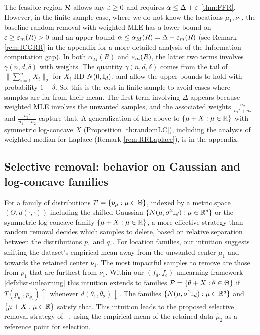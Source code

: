 \begin{remark} \label{rem:ICGRRM}
The feasible region $\mathcal{R}$ allows any $\varepsilon \geq 0$ and requires $\alpha \leq \Delta +\varepsilon$ \ref{thm:FFR}. However, in the finite sample case, where we do not know the locations $\mu_1, \nu_1$, the baseline random removal with weighted MLE has a  lower bound on $\varepsilon \geq \varepsilon_m(R)>0$ and an upper bound $\alpha \leq \alpha_M(R)= \Delta -\varepsilon_m(R)$ (see Remark \ref{rem:ICGRR} in the appendix for a more detailed analysis of the Information-computation gap). In both $\alpha_M(R)$ and  $\varepsilon_m(R)$, the latter two terms involves  $\gamma(n, d, \delta)$ with weights. The quantity $\gamma(n, d, \delta)$ comes from the tail of $\|\sum_{i=1}^n X_i\|_2$ for $X_i$ IID $N(0,\mathbb{I}_d)$, and allow the upper bounds to hold with probability $1-\delta$. So, this is the cost in finite sample to avoid cases where samples are far from their mean. The first term involving $\Delta$ appears because weighted MLE involves the unwanted samples, and the associated weights $\frac{n_2}{n_1' + n_2}$ and $\frac{n_1'}{n_1' + n_2}$ capture that. A generalization of the above to  $\{\mu+X:\mu\in \mathbb{R}\}$ with symmetric log-concave $X$ (Proposition \ref{th:randomLC}), including the analysis of weighted median for Laplace (Remark \ref{rem:RRLaplace}), is in the appendix.
\end{remark} 
 


\vspace{-4mm}
\subsection{Selective removal: behavior on Gaussian and log-concave families}
\vspace{-2mm}

For a family of distributions $\mathcal{P}=\{p_{\mu}: \mu\in \Theta\}$, indexed by a metric space  $(\Theta, d(\cdot, \cdot))$  including the shifted Gaussian $\{N(\mu, \sigma^2 \mathbb{I}_d): \mu \in \mathbb{R}^d\}$ or the symmetric log-concave family $\{\mu+X: \mu\in \mathbb{R}\}$, a more effective strategy than random removal decides which samples to delete, based on relative separation between the distributions $p_1$ and $q_1$. For location families, our intuition suggests shifting the dataset's empirical mean away from the unwanted center $\mu_1$ and towards the retained center $\nu_1$. The most impactful samples to remove are those from $p_1$ that are furthest from $\nu_1$. Within our $(f_d,f_c)$ unlearning framework \ref{def:dist-unlearning} this intuition extends to families $\mathcal{P}=\{\theta+X: \theta\in \Theta\}$ if $T(p_{\theta_1}, p_{\theta_2}) \uparrow$ whenever $d(\theta_1,\theta_2)\downarrow $. The families $\{N(\mu, \sigma^2 \mathbb{I}_d): \mu \in \mathbb{R}^d\}$ and $\{\mu+X: \mu\in \mathbb{R}\}$ satisfy that.
This intuition leads to the proposed selective removal strategy of ~\citep{allouah2025distributionalmachineunlearningselective}, using the empirical mean of the retained data $\hat{\mu}_2$ as a reference point for selection. 

